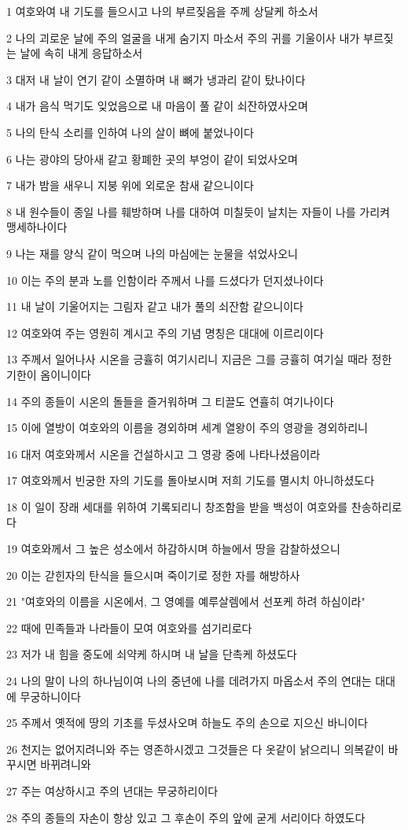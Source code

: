 \par 1 여호와여 내 기도를 들으시고 나의 부르짖음을 주께 상달케 하소서
\par 2 나의 괴로운 날에 주의 얼굴을 내게 숨기지 마소서 주의 귀를 기울이사 내가 부르짖는 날에 속히 내게 응답하소서
\par 3 대저 내 날이 연기 같이 소멸하며 내 뼈가 냉과리 같이 탔나이다
\par 4 내가 음식 먹기도 잊었음으로 내 마음이 풀 같이 쇠잔하였사오며
\par 5 나의 탄식 소리를 인하여 나의 살이 뼈에 붙었나이다
\par 6 나는 광야의 당아새 같고 황폐한 곳의 부엉이 같이 되었사오며
\par 7 내가 밤을 새우니 지붕 위에 외로운 참새 같으니이다
\par 8 내 원수들이 종일 나를 훼방하며 나를 대하여 미칠듯이 날치는 자들이 나를 가리켜 맹세하나이다
\par 9 나는 재를 양식 같이 먹으며 나의 마심에는 눈물을 섞었사오니
\par 10 이는 주의 분과 노를 인함이라 주께서 나를 드셨다가 던지셨나이다
\par 11 내 날이 기울어지는 그림자 같고 내가 풀의 쇠잔함 같으니이다
\par 12 여호와여 주는 영원히 계시고 주의 기념 명칭은 대대에 이르리이다
\par 13 주께서 일어나사 시온을 긍휼히 여기시리니 지금은 그를 긍휼히 여기실 때라 정한 기한이 옴이니이다
\par 14 주의 종들이 시온의 돌들을 즐거워하며 그 티끌도 연휼히 여기나이다
\par 15 이에 열방이 여호와의 이름을 경외하며 세계 열왕이 주의 영광을 경외하리니
\par 16 대저 여호와께서 시온을 건설하시고 그 영광 중에 나타나셨음이라
\par 17 여호와께서 빈궁한 자의 기도를 돌아보시며 저희 기도를 멸시치 아니하셨도다
\par 18 이 일이 장래 세대를 위하여 기록되리니 창조함을 받을 백성이 여호와를 찬송하리로다
\par 19 여호와께서 그 높은 성소에서 하감하시며 하늘에서 땅을 감찰하셨으니
\par 20 이는 갇힌자의 탄식을 들으시며 죽이기로 정한 자를 해방하사
\par 21 "여호와의 이름을 시온에서, 그 영예를 예루살렘에서 선포케 하려 하심이라"
\par 22 때에 민족들과 나라들이 모여 여호와를 섬기리로다
\par 23 저가 내 힘을 중도에 쇠약케 하시며 내 날을 단촉케 하셨도다
\par 24 나의 말이 나의 하나님이여 나의 중년에 나를 데려가지 마옵소서 주의 연대는 대대에 무궁하니이다
\par 25 주께서 옛적에 땅의 기초를 두셨사오며 하늘도 주의 손으로 지으신 바니이다
\par 26 천지는 없어지려니와 주는 영존하시겠고 그것들은 다 옷같이 낡으리니 의복같이 바꾸시면 바뀌려니와
\par 27 주는 여상하시고 주의 년대는 무궁하리이다
\par 28 주의 종들의 자손이 항상 있고 그 후손이 주의 앞에 굳게 서리이다 하였도다


